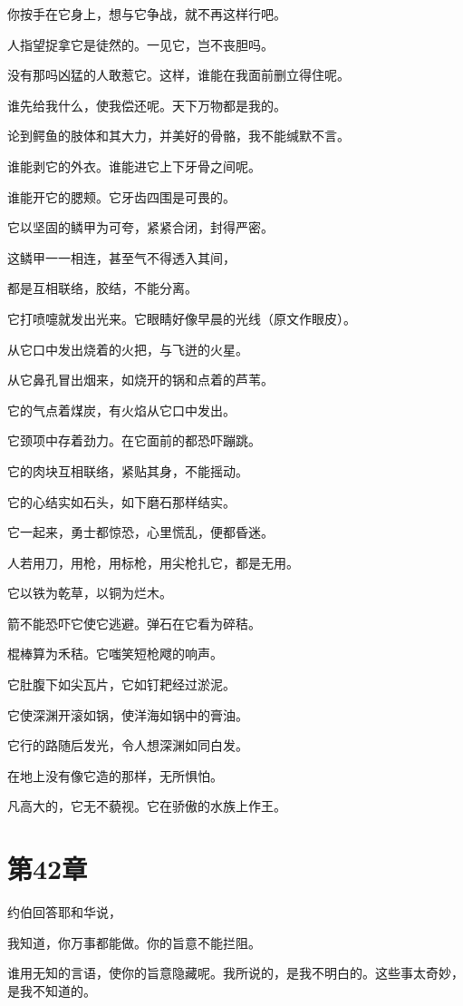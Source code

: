 \documentclass[12pt,oneside]{book}
\begin{document}
你按手在它身上，想与它争战，就不再这样行吧。

人指望捉拿它是徒然的。一见它，岂不丧胆吗。

没有那吗凶猛的人敢惹它。这样，谁能在我面前删立得住呢。

谁先给我什么，使我偿还呢。天下万物都是我的。

论到鳄鱼的肢体和其大力，并美好的骨骼，我不能缄默不言。

谁能剥它的外衣。谁能进它上下牙骨之间呢。

谁能开它的腮颊。它牙齿四围是可畏的。

它以坚固的鳞甲为可夸，紧紧合闭，封得严密。

这鳞甲一一相连，甚至气不得透入其间，

都是互相联络，胶结，不能分离。

它打喷嚏就发出光来。它眼睛好像早晨的光线（原文作眼皮）。

从它口中发出烧着的火把，与飞迸的火星。

从它鼻孔冒出烟来，如烧开的锅和点着的芦苇。

它的气点着煤炭，有火焰从它口中发出。

它颈项中存着劲力。在它面前的都恐吓蹦跳。

它的肉块互相联络，紧贴其身，不能摇动。

它的心结实如石头，如下磨石那样结实。

它一起来，勇士都惊恐，心里慌乱，便都昏迷。

人若用刀，用枪，用标枪，用尖枪扎它，都是无用。

它以铁为乾草，以铜为烂木。

箭不能恐吓它使它逃避。弹石在它看为碎秸。

棍棒算为禾秸。它嗤笑短枪飕的响声。

它肚腹下如尖瓦片，它如钉耙经过淤泥。

它使深渊开滚如锅，使洋海如锅中的膏油。

它行的路随后发光，令人想深渊如同白发。

在地上没有像它造的那样，无所惧怕。

凡高大的，它无不藐视。它在骄傲的水族上作王。


\chapter{第42章}
约伯回答耶和华说，

我知道，你万事都能做。你的旨意不能拦阻。

谁用无知的言语，使你的旨意隐藏呢。我所说的，是我不明白的。这些事太奇妙，是我不知道的。
\end{document}
